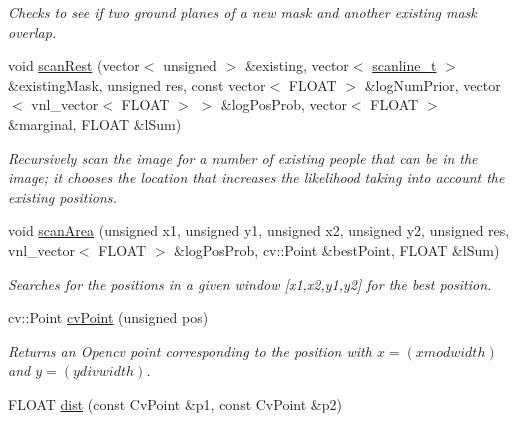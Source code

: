 \begin{DoxyCompactItemize}
\begin{DoxyCompactList}\small\item\em Checks to see if two ground planes of a new mask and another existing mask overlap. \item\end{DoxyCompactList}\item 
\hypertarget{classfindPersonImage_a8611da54df0f3123597e5b09864e52ea}{
void \hyperlink{classfindPersonImage_a8611da54df0f3123597e5b09864e52ea}{scanRest} (vector$<$ unsigned $>$ \&existing, vector$<$ \hyperlink{structscanline__t}{scanline\_\-t} $>$ \&existingMask, unsigned res, const vector$<$ FLOAT $>$ \&logNumPrior, vector$<$ vnl\_\-vector$<$ FLOAT $>$ $>$ \&logPosProb, vector$<$ FLOAT $>$ \&marginal, FLOAT \&lSum)}
\label{classfindPersonImage_a8611da54df0f3123597e5b09864e52ea}

\begin{DoxyCompactList}\small\item\em Recursively scan the image for a number of existing people that can be in the image; it chooses the location that increases the likelihood taking into account the existing positions. \item\end{DoxyCompactList}\item 
\hypertarget{classfindPersonImage_a9692104f77f753a47ee46486f33ca66c}{
void \hyperlink{classfindPersonImage_a9692104f77f753a47ee46486f33ca66c}{scanArea} (unsigned x1, unsigned y1, unsigned x2, unsigned y2, unsigned res, vnl\_\-vector$<$ FLOAT $>$ \&logPosProb, cv::Point \&bestPoint, FLOAT \&lSum)}
\label{classfindPersonImage_a9692104f77f753a47ee46486f33ca66c}

\begin{DoxyCompactList}\small\item\em Searches for the positions in a given window \mbox{[}x1,x2,y1,y2\mbox{]} for the best position. \item\end{DoxyCompactList}\item 
\hypertarget{classfindPersonImage_ac8da170ee071392aeef5385795d4bc3e}{
cv::Point \hyperlink{classfindPersonImage_ac8da170ee071392aeef5385795d4bc3e}{cvPoint} (unsigned pos)}
\label{classfindPersonImage_ac8da170ee071392aeef5385795d4bc3e}

\begin{DoxyCompactList}\small\item\em Returns an Opencv point corresponding to the position with $ x = (x mod width)$ and $ y = (y div width)$. \item\end{DoxyCompactList}\item 
\hypertarget{classfindPersonImage_a400f30b8f239fae9c9b767fb6ecc1d3f}{
FLOAT \hyperlink{classfindPersonImage_a400f30b8f239fae9c9b767fb6ecc1d3f}{dist} (const CvPoint \&p1, const CvPoint \&p2)}
\label{classfindPersonImage_a400f30b8f239fae9c9b767fb6ecc1d3f}


\end{DoxyCompactItemize}
